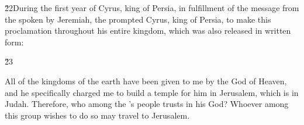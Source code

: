 \v{22}During the first year of Cyrus, king of Persia, in fulfillment of the message from the  spoken by Jeremiah, the  prompted Cyrus, king of Persia, to make this proclamation throughout his entire kingdom, which was also released in written form:

\v{23}  

\begin{poetry}
\poeml All of the kingdoms of the earth have been given to me by the  God of Heaven, and he specifically charged me to build a temple for him in Jerusalem, which is in Judah. Therefore, who among the 's people trusts in his God? Whoever among this group wishes to do so may travel to Jerusalem.
\end{poetry}
